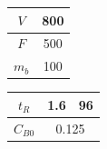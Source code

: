 \begin{table}[htbp]
    \vspace{0.3cm}
    \begin{minipage}{0.45\textwidth}
        \centering
        \begin{tabular}{|c|c|}
            \hline
            \rowcolor{orange!20} \textbf{$V$}   & 800 \\ \hline
            \rowcolor{orange!20} \textbf{$F$}   & 500 \\ \hline
            \rowcolor{orange!20} \textbf{$m_b$} & 100 \\ \hline
        \end{tabular}
    \end{minipage}
    \hfill
    \begin{minipage}{0.45\textwidth}
        \centering
        \begin{tabular}{|c|c|c|}
            \hline
            \rowcolor{orange!20} \textbf{$t_R$}    & 1.6                        & 96 \\ \hline
            \rowcolor{orange!20} \textbf{$C_{B0}$} & \multicolumn{2}{c|}{0.125}      \\ \hline
        \end{tabular}
    \end{minipage}
\end{table}
